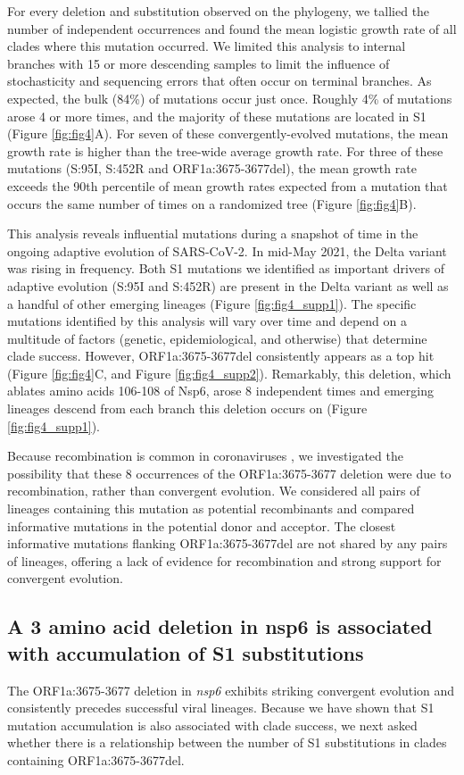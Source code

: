 \documentclass[11pt,oneside,letterpaper]{article}
\begin{document}
For every deletion and substitution observed on the phylogeny, we tallied the number of independent occurrences and found the mean logistic growth rate of all clades where this mutation occurred. We limited this analysis to internal branches with 15 or more descending samples to limit the influence of stochasticity and sequencing errors that often occur on terminal branches. As expected, the bulk (84\%) of mutations occur just once. Roughly 4\% of mutations arose 4 or more times, and the majority of these mutations are located in S1 (Figure \ref{fig:fig4}A). For seven of these convergently-evolved mutations, the mean growth rate is higher than the tree-wide average growth rate. For three of these mutations (S:95I, S:452R and ORF1a:3675-3677del), the mean growth rate exceeds the 90th percentile of mean growth rates expected from a mutation that occurs the same number of times on a randomized tree (Figure \ref{fig:fig4}B).

This analysis reveals influential mutations during a snapshot of time in the ongoing adaptive evolution of SARS-CoV-2. In mid-May 2021, the Delta variant was rising in frequency. Both S1 mutations we identified as important drivers of adaptive evolution (S:95I and S:452R) are present in the Delta variant as well as a handful of other emerging lineages (Figure \ref{fig:fig4_supp1}). The specific mutations identified by this analysis will vary over time and depend on a multitude of factors (genetic, epidemiological, and otherwise) that determine clade success. However, ORF1a:3675-3677del consistently appears as a top hit (Figure \ref{fig:fig4}C, and Figure \ref{fig:fig4_supp2}). Remarkably, this deletion, which ablates amino acids 106-108 of Nsp6, arose 8 independent times and emerging lineages descend from each branch this deletion occurs on (Figure \ref{fig:fig4_supp1}).

Because recombination is common in coronaviruses \cite{Muller2021-qq, Turkahia2021-ao}, we investigated the possibility that these 8 occurrences of the ORF1a:3675-3677 deletion were due to recombination, rather than convergent evolution. We considered all pairs of lineages containing this mutation as potential recombinants and compared informative mutations in the potential donor and acceptor. The closest informative mutations flanking ORF1a:3675-3677del are not shared by any pairs of lineages, offering a lack of evidence for recombination and strong support for convergent evolution.

\subsection*{A 3 amino acid deletion in nsp6 is associated with accumulation of S1 substitutions}
The ORF1a:3675-3677 deletion in \emph{nsp6} exhibits striking convergent evolution and consistently precedes successful viral lineages. Because we have shown that S1 mutation accumulation is also associated with clade success, we next asked whether there is a relationship between the number of S1 substitutions in clades containing ORF1a:3675-3677del.
\end{document}
